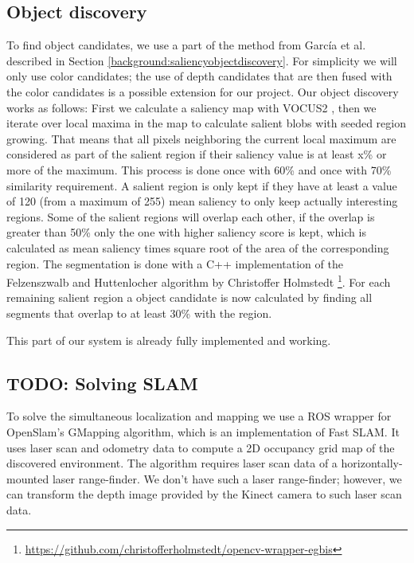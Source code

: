 \documentclass[a4paper,11pt,english]{article}
\begin{document}
\subsection{Object discovery}
\label{system:obj_discovery}
To find object candidates, we use a part of the method from García et al. described in Section \ref{background:saliencyobjectdiscovery}.
For simplicity we will only use color candidates; the use of depth candidates that are then fused with the color candidates is a possible extension for our project.
Our object discovery works as follows: First we calculate a saliency map with VOCUS2 \cite{frintrop2015traditional}, then we iterate over local maxima in the map to calculate salient blobs with seeded region growing.
That means that all pixels neighboring the current local maximum are considered as part of the salient region if their saliency value is at least x\% or more of the maximum.
This process is done once with 60\% and once with 70\% similarity requirement.
A salient region is only kept if they have at least a value of 120 (from a maximum of 255) mean saliency to only keep actually interesting regions.
Some of the salient regions will overlap each other, if the overlap is greater than 50\% only the one with higher saliency score is kept, which is calculated as mean saliency times square root of the area of the corresponding region.
The segmentation is done with a C++ implementation of the Felzenszwalb and Huttenlocher algorithm \cite{felzenszwalb2004efficient} by Christoffer Holmstedt \footnote{\url{https://github.com/christofferholmstedt/opencv-wrapper-egbis}}.
For each remaining salient region a object candidate is now calculated by finding all segments that overlap to at least 30\% with the region.

This part of our system is already fully implemented and working.

\subsection{TODO: Solving SLAM}
\label{system:slam}
To solve the simultaneous localization and mapping we use a ROS wrapper for OpenSlam's GMapping algorithm, which is an implementation of Fast SLAM.
It uses laser scan and odometry data to compute a 2D occupancy grid map of the discovered environment.
The algorithm requires laser scan data of a horizontally-mounted laser range-finder.
We don't have such a laser range-finder; however, we can transform the depth image provided by the Kinect camera to such laser scan data.
\end{document}
